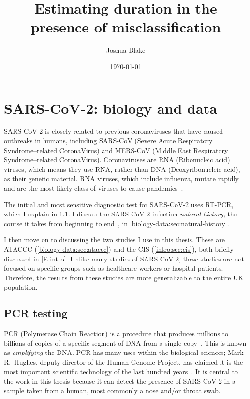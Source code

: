 \documentclass[thesis.tex]{subfiles}
\title{Estimating duration in the presence of misclassification}
\author{Joshua Blake}
\date{\today}
\begin{document}
\ifSubfilesClassLoaded{
  \setcounter{chapter}{1}
}

\chapter{SARS-CoV-2: biology and data} \label{biology-data}

SARS-CoV-2 is closely related to previous coronaviruses that have caused outbreaks in humans, including SARS-CoV (Severe Acute Respiratory Syndrome--related CoronaVirus) and MERS-CoV (Middle East Respiratory Syndrome--related CoronaVirus).
Coronaviruses are RNA (Ribonucleic acid) viruses, which means they use RNA, rather than DNA (Deoxyribonucleic acid), as their genetic material.
RNA viruses, which include influenza, mutate rapidly and are the most likely class of viruses to cause pandemics~\autocite{woolhouseRNA}.

The initial and most sensitive diagnostic test for SARS-CoV-2 uses RT-PCR, which I explain in \cref{biology-data:sec:PCR}.
I discuss the SARS-CoV-2 infection \emph{natural history}, the course it takes from beginning to end~\autocite[193]{portaEpiDictionary}, in \cref{biology-data:sec:natural-history}.

I then move on to discussing the two studies I use in this thesis.
These are ATACCC (\cref{biology-data:sec:ataccc}) and the CIS (\cref{intro:sec:cis}), both briefly discussed in \cref{E-intro}.
Unlike many studies of SARS-CoV-2, these studies are not focused on specific groups such as healthcare workers or hospital patients.
Therefore, the results from these studies are more generalizable to the entire UK population.

\section{PCR testing} \label{biology-data:sec:PCR}

PCR (Polymerase Chain Reaction) is a procedure that produces millions to billions of copies of a specific segment of DNA  from a single copy~\autocite{smithPCR,garibyanPCR}.
This is known as \emph{amplifying} the DNA.
PCR has many uses within the biological sciences; Mark R.\ Hughes, deputy director of the Human Genome Project, has claimed it is the most important scientific technology of the last hundred years~\autocite{powledgePCR}.
It is central to the work in this thesis because it can detect the presence of SARS-CoV-2 in a sample taken from a human, most commonly a nose and/or throat swab.
\end{document}
